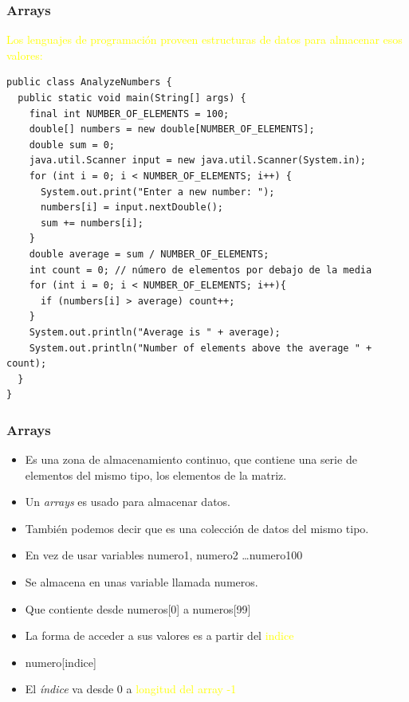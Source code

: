 \documentclass{beamer}
\begin{document}
\begin{frame}[fragile]
\frametitle{Arrays}
\textcolor{yellow}{Los lenguajes de programación proveen estructuras de datos para almacenar esos valores:}
\pause

\begin{tiny}
\begin{verbatim}
public class AnalyzeNumbers {
  public static void main(String[] args) {
    final int NUMBER_OF_ELEMENTS = 100;
    double[] numbers = new double[NUMBER_OF_ELEMENTS];
    double sum = 0;
    java.util.Scanner input = new java.util.Scanner(System.in);
    for (int i = 0; i < NUMBER_OF_ELEMENTS; i++) {
      System.out.print("Enter a new number: ");
      numbers[i] = input.nextDouble();
      sum += numbers[i];
    }
    double average = sum / NUMBER_OF_ELEMENTS;
    int count = 0; // número de elementos por debajo de la media
    for (int i = 0; i < NUMBER_OF_ELEMENTS; i++){
      if (numbers[i] > average) count++;
    }
    System.out.println("Average is " + average);
    System.out.println("Number of elements above the average " + count);
  }
}
\end{verbatim}
\end{tiny}
\end{frame}

\begin{frame}
    \frametitle{Arrays}

\begin{itemize}[<+-| alert@+>]
	\item Es una zona de almacenamiento continuo, que contiene una serie de elementos del mismo tipo, los elementos de la matriz.
      \item Un \emph{arrays} es usado para almacenar datos.
      \item También podemos decir que es una colección de datos del mismo tipo.
      \item En vez de usar variables numero1, numero2 \dots numero100      
      \item Se almacena en unas variable llamada numeros.
      \item Que contiente desde numeros[0] a numeros[99]
      \item La forma de acceder a sus valores es a partir del \textcolor{yellow}{indice}
      \item numero[indice]
      \item El \emph{índice} va desde 0 a \textcolor{yellow}{longitud del array -1}
      \end{itemize}
      \pause
\end{frame}
\end{document}
